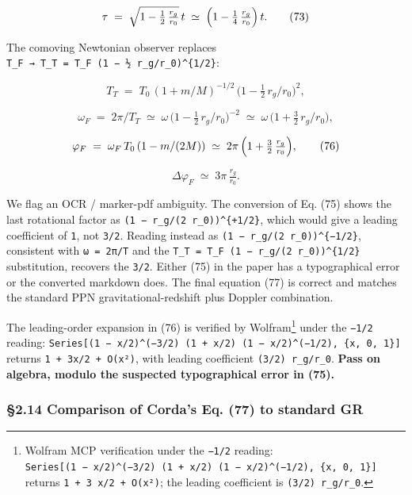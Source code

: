 \documentclass[
  11pt,
]{article}
\begin{document}
\[
\tau
\;=\; \sqrt{1 - \tfrac{1}{2}\,\tfrac{r_{g}}{r_{0}}}\,t
\;\simeq\; \Bigl(1 - \tfrac{1}{4}\,\tfrac{r_{g}}{r_{0}}\Bigr)\,t. \tag{73}
\]

The comoving Newtonian observer replaces
\texttt{T\_F\ →\ T\_T\ =\ T\_F\ (1\ −\ ½\ r\_g/r\_0)\^{}\{1/2\}}:

\[
T_{T} \;=\; T_{0}\,(1 + m/M)^{-1/2}\,\bigl(1 - \tfrac{1}{2}\,r_{g}/r_{0}\bigr)^{2}, \tag{74}
\]

\[
\omega_{F}
\;=\; 2\pi/T_{T}
\;\simeq\; \omega\,\bigl(1 - \tfrac{1}{2}\,r_{g}/r_{0}\bigr)^{-2}
\;\simeq\; \omega\,\bigl(1 + \tfrac{3}{2}\,r_{g}/r_{0}\bigr), \tag{75}
\]

\[
\varphi_{F}
\;=\; \omega_{F}\,T_{0}\,(1 - m/(2M))
\;\simeq\; 2\pi\,\Bigl(1 + \tfrac{3}{2}\,\tfrac{r_{g}}{r_{0}}\Bigr), \tag{76}
\]

\[
\Delta\varphi_{F}
\;\simeq\; 3\pi\,\tfrac{r_{g}}{r_{0}}. \tag{77}
\]

We flag an OCR / marker-pdf ambiguity. The conversion of Eq. (75) shows
the last rotational factor as
\texttt{(1\ −\ r\_g/(2\ r\_0))\^{}\{+1/2\}}, which would give a leading
coefficient of \texttt{1}, not \texttt{3/2}. Reading instead as
\texttt{(1\ −\ r\_g/(2\ r\_0))\^{}\{−1/2\}}, consistent with
\texttt{ω\ =\ 2π/T} and the
\texttt{T\_T\ =\ T\_F\ (1\ −\ r\_g/(2\ r\_0))\^{}\{1/2\}} substitution,
recovers the \texttt{3/2}. Either (75) in the paper has a typographical
error or the converted markdown does. The final equation (77) is correct
and matches the standard PPN gravitational-redshift plus Doppler
combination.

The leading-order expansion in (76) is verified by Wolfram\footnote{Wolfram
  MCP verification under the \texttt{−1/2} reading:
  \texttt{Series{[}(1\ −\ x/2)\^{}(−3/2)\ (1\ +\ x/2)\ (1\ −\ x/2)\^{}(−1/2),\ \{x,\ 0,\ 1\}{]}}
  returns \texttt{1\ +\ 3\ x/2\ +\ O(x²)}; the leading coefficient is
  \texttt{(3/2)\ r\_g/r\_0}.} under the \texttt{−1/2} reading:
\texttt{Series{[}(1\ −\ x/2)\^{}(−3/2)\ (1\ +\ x/2)\ (1\ −\ x/2)\^{}(−1/2),\ \{x,\ 0,\ 1\}{]}}
returns \texttt{1\ +\ 3x/2\ +\ O(x²)}, with leading coefficient
\texttt{(3/2)\ r\_g/r\_0}. \textbf{Pass on algebra, modulo the suspected
typographical error in (75).}

\hypertarget{comparison-of-cordas-eq.-77-to-standard-gr}{%
\subsubsection{§2.14 Comparison of Corda's Eq. (77) to standard
GR}\label{comparison-of-cordas-eq.-77-to-standard-gr}}
\end{document}
